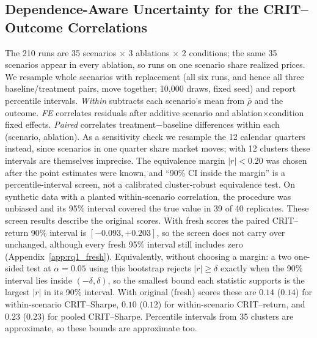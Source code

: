 \documentclass{article}
\begin{document}
\subsection{Dependence-Aware Uncertainty for the CRIT--Outcome Correlations}
\label{app:rq1_clustered}

The 210 runs are 35 scenarios $\times$ 3 ablations $\times$ 2 conditions; the same 35
scenarios appear in every ablation, so runs on one scenario share realized prices. We
resample whole scenarios with replacement (all six runs, and hence all three
baseline/treatment pairs, move together; 10{,}000 draws, fixed seed) and report
percentile intervals. \emph{Within} subtracts each scenario's mean from $\bar{\rho}$ and
the outcome. \emph{FE} correlates residuals after additive scenario and
ablation$\times$condition fixed effects. \emph{Paired} correlates treatment$-$baseline
differences within each (scenario, ablation). As a sensitivity check we resample the 12
calendar quarters instead, since scenarios in one quarter share market moves; with 12
clusters these intervals are themselves imprecise. The equivalence margin
$|r|{<}0.20$ was chosen after the point estimates were known, and ``90\% CI inside the
margin'' is a percentile-interval screen, not a calibrated cluster-robust equivalence
test. On synthetic data with a planted within-scenario correlation, the procedure was
unbiased and its 95\% interval covered the true value in 39 of 40 replicates. These screen results describe the original scores. With fresh scores the paired CRIT--return 90\% interval is $[-0.093,+0.203]$, so the screen does not carry over unchanged, although every fresh 95\% interval still includes zero (Appendix~\ref{app:rq1_fresh}).
Equivalently, without choosing a margin: a two one-sided test at $\alpha{=}0.05$ using this bootstrap rejects $|r|{\ge}\delta$ exactly when the 90\% interval lies inside $(-\delta,\delta)$, so the smallest bound each statistic supports is the largest $|r|$ in its 90\% interval. With original (fresh) scores these are $0.14$ ($0.14$) for within-scenario CRIT--Sharpe, $0.10$ ($0.12$) for within-scenario CRIT--return, and $0.23$ ($0.23$) for pooled CRIT--Sharpe. Percentile intervals from 35 clusters are approximate, so these bounds are approximate too.
\end{document}
